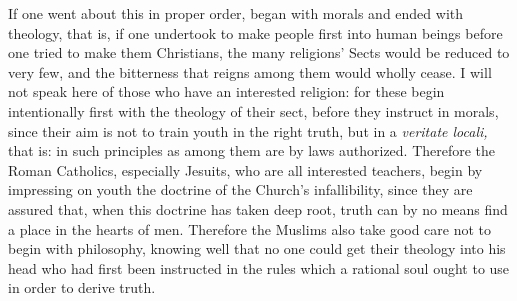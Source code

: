 \documentclass[12pt,a4paper,openany]{book}
\newcommand{\opage}[1]{\marginnote{\footnotesize\textit{[#1]}}}
\begin{document}
If one went about this in proper order, began with morals and ended with
theology, that is, if one undertook to make people first into human beings before
one tried to make them Christians, the many religions' Sects would be reduced to
very few, and the bitterness that reigns among them would wholly cease. I will
not speak here of those who have an interested religion: for these begin
intentionally first with the theology of their sect, before they instruct in
morals, since their aim is not to train youth in the right truth, but in a
\textit{veritate locali,} that is: in such principles as among them are by laws
\setcounter{footnote}{0}%
\opage{17}authorized. Therefore the Roman Catholics, especially Jesuits, who are all
interested teachers, begin by impressing on youth the doctrine of the Church's
infallibility, since they are assured that, when this doctrine has taken deep
root, truth can by no means find a place in the hearts of men. Therefore the
Muslims also take good care not to begin with philosophy, knowing well that
no one could get their theology into his head who had first been instructed in
the rules which a rational soul ought to use in order to derive truth.
\end{document}
